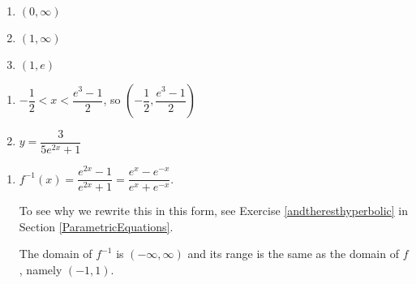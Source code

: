 \documentclass{ximera}
\begin{document}
\begin{enumerate}
\setcounter{enumi}{\value{HW}}

\item    $(0, \infty)$
  
\item    $(1, \infty)$    

\item    $(1,e)$ 


\setcounter{HW}{\value{enumi}}
\end{enumerate}


\begin{enumerate}
\setcounter{enumi}{\value{HW}}

\item $-\dfrac{1}{2} < x < \dfrac{e^{3} - 1}{2}$, so $\left( -\dfrac{1}{2}, \dfrac{e^{3} - 1}{2}\right)$

\item $y = \dfrac{3}{5e^{2x} + 1}$ 

\setcounter{HW}{\value{enumi}}
\end{enumerate}

\begin{enumerate}
\setcounter{enumi}{\value{HW}}
\addtocounter{enumi}{1}

\item $f^{-1}(x) = \dfrac{e^{2x} - 1}{e^{2x} + 1} = \dfrac{e^{x} - e^{-x}}{e^{x} + e^{-x}}$. 

To see why we rewrite this in this form, see  Exercise \ref{andtheresthyperbolic} in Section \ref{ParametricEquations}.

 The domain of $f^{-1}$ is $(-\infty, \infty)$ and its range is the same as the domain of $f$, namely $(-1, 1)$.

\setcounter{HW}{\value{enumi}}
\end{enumerate}

\newpage
\end{document}
